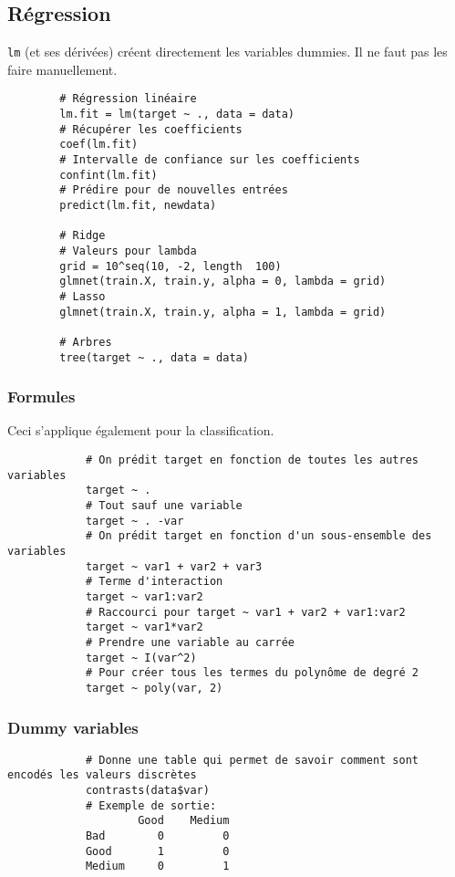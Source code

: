 \subsection{Régression}
    \begin{remarque}
        \lstinline{lm} (et ses dérivées) créent directement les variables dummies. Il ne faut pas les faire manuellement.
    \end{remarque}

    \begin{lstlisting}
        # Régression linéaire
        lm.fit = lm(target ~ ., data = data)
        # Récupérer les coefficients
        coef(lm.fit)
        # Intervalle de confiance sur les coefficients
        confint(lm.fit)
        # Prédire pour de nouvelles entrées
        predict(lm.fit, newdata)

        # Ridge
        # Valeurs pour lambda
        grid = 10^seq(10, -2, length  100)
        glmnet(train.X, train.y, alpha = 0, lambda = grid)
        # Lasso
        glmnet(train.X, train.y, alpha = 1, lambda = grid)

        # Arbres
        tree(target ~ ., data = data)
    \end{lstlisting}

    \subsubsection{Formules}
        \begin{remarque}
            Ceci s'applique également pour la classification.
        \end{remarque}

        \begin{lstlisting}
            # On prédit target en fonction de toutes les autres variables
            target ~ .
            # Tout sauf une variable
            target ~ . -var
            # On prédit target en fonction d'un sous-ensemble des variables
            target ~ var1 + var2 + var3
            # Terme d'interaction
            target ~ var1:var2
            # Raccourci pour target ~ var1 + var2 + var1:var2
            target ~ var1*var2
            # Prendre une variable au carrée
            target ~ I(var^2)
            # Pour créer tous les termes du polynôme de degré 2
            target ~ poly(var, 2)
        \end{lstlisting}

    \subsubsection{Dummy variables}
        \begin{lstlisting}
            # Donne une table qui permet de savoir comment sont encodés les valeurs discrètes
            contrasts(data$var)
            # Exemple de sortie:
                    Good    Medium
            Bad        0         0
            Good       1         0
            Medium     0         1
        \end{lstlisting}